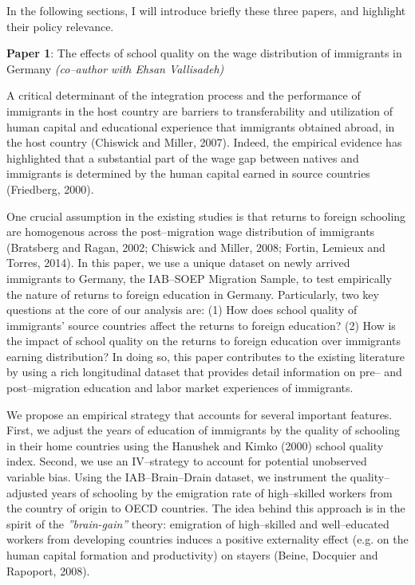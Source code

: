 \documentclass[a4paper, 10pt]{article} %
\begin{document}
In the following sections, I will introduce briefly these three papers, and highlight their policy relevance.

\vspace{10pt}

\textbf{Paper 1}: The effects of school quality on the wage distribution of immigrants in Germany \textit{ (co--author with Ehsan Vallisadeh)}

\vspace{10pt}

A critical determinant of the integration process and the performance of immigrants in the host country are barriers to transferability and utilization of human capital and educational experience that immigrants obtained abroad, in the host country (Chiswick and Miller, 2007). Indeed, the empirical evidence has highlighted that a substantial part of the wage gap between natives and immigrants is determined by the human capital earned in source countries (Friedberg, 2000).

One crucial assumption in the existing studies is that returns to foreign schooling are homogenous across the post--migration wage distribution of immigrants (Bratsberg and Ragan, 2002; Chiswick and Miller, 2008; Fortin, Lemieux and Torres, 2014). In this paper, we use a unique dataset on newly arrived immigrants to Germany, the IAB--SOEP Migration Sample, to test empirically the nature of returns to foreign education in Germany. Particularly, two key questions at the core of our analysis are: (1) How does school quality of immigrants' source countries affect the returns to foreign education? (2) How is the impact of school quality on the returns to foreign education over immigrants earning distribution? In doing so, this paper contributes to the existing literature by using a rich longitudinal dataset that provides detail information on pre-- and post--migration education and labor market experiences of immigrants.

We propose an empirical strategy that accounts for several important features. First, we adjust the years of education of immigrants by the quality of schooling in their home countries using the Hanushek and Kimko (2000) school quality index. Second, we use an IV--strategy to account for potential unobserved variable bias. Using the IAB--Brain--Drain dataset, we instrument the quality--adjusted years of schooling by the emigration rate of high--skilled workers from the country of origin to OECD countries. The idea behind this approach is in the spirit of the \textit{''brain-gain''} theory: emigration of high--skilled and well--educated workers from developing countries induces a positive externality effect (e.g. on the human capital formation and productivity) on stayers (Beine, Docquier and Rapoport, 2008).
\end{document}
